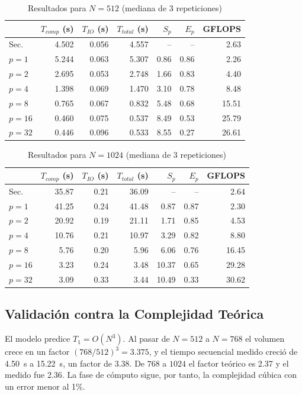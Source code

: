 \documentclass[conference]{IEEEtran}
\begin{document}
\begin{table}[H]
\caption{Resultados para $N=512$ (mediana de 3 repeticiones)}
\label{tab:n512}
\centering
\begin{tabular}{lrrrrrr}
\toprule
 & $T_{comp}$ (s) & $T_{IO}$ (s) & $T_{total}$ (s) & $S_p$ & $E_p$ & GFLOPS \\
\midrule
Sec.   & 4.502 & 0.056 & 4.557 & --   & --   & 2.63 \\
$p=1$  & 5.244 & 0.063 & 5.307 & 0.86 & 0.86 & 2.26 \\
$p=2$  & 2.695 & 0.053 & 2.748 & 1.66 & 0.83 & 4.40 \\
$p=4$  & 1.398 & 0.069 & 1.470 & 3.10 & 0.78 & 8.48 \\
$p=8$  & 0.765 & 0.067 & 0.832 & 5.48 & 0.68 & 15.51 \\
$p=16$ & 0.460 & 0.075 & 0.537 & 8.49 & 0.53 & 25.79 \\
$p=32$ & 0.446 & 0.096 & 0.533 & 8.55 & 0.27 & 26.61 \\
\bottomrule
\end{tabular}
\end{table}

\begin{table}[H]
\caption{Resultados para $N=1024$ (mediana de 3 repeticiones)}
\label{tab:n1024}
\centering
\begin{tabular}{lrrrrrr}
\toprule
 & $T_{comp}$ (s) & $T_{IO}$ (s) & $T_{total}$ (s) & $S_p$ & $E_p$ & GFLOPS \\
\midrule
Sec.   & 35.87 & 0.21 & 36.09 & --    & --   & 2.64 \\
$p=1$  & 41.25 & 0.24 & 41.48 & 0.87  & 0.87 & 2.30 \\
$p=2$  & 20.92 & 0.19 & 21.11 & 1.71  & 0.85 & 4.53 \\
$p=4$  & 10.76 & 0.21 & 10.97 & 3.29  & 0.82 & 8.80 \\
$p=8$  & 5.76  & 0.20 & 5.96  & 6.06  & 0.76 & 16.45 \\
$p=16$ & 3.23  & 0.24 & 3.48  & 10.37 & 0.65 & 29.28 \\
$p=32$ & 3.09  & 0.33 & 3.44  & 10.49 & 0.33 & 30.62 \\
\bottomrule
\end{tabular}
\end{table}

\subsection{Validación contra la Complejidad Teórica}
El modelo predice $T_1 = O(N^3)$. Al pasar de $N=512$ a $N=768$ el volumen crece en un factor $(768/512)^3 = 3.375$, y el tiempo secuencial medido creció de 4.50~s a 15.22~s, un factor de 3.38. De $768$ a $1024$ el factor teórico es 2.37 y el medido fue 2.36. La fase de cómputo sigue, por tanto, la complejidad cúbica con un error menor al 1\%.
\end{document}
